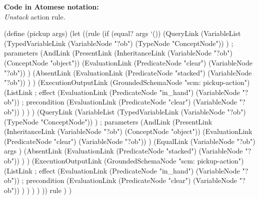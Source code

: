 \begin{footnotesize}
\textbf{Code in Atomese notation:} \\
\textit{Unstack} action rule.
\end{footnotesize}

\begin{python}
(define (pickup args)
  (let 
    ((rule
      (if (equal? args `())
        (QueryLink
          (VariableList
            (TypedVariableLink 
              (VariableNode "?ob") 
              (TypeNode "ConceptNode"))
          ) ; parameters
          (AndLink
            (PresentLink
              (InheritanceLink
                (VariableNode "?ob")
                (ConceptNode "object"))
              (EvaluationLink
                (PredicateNode "clear")
                (VariableNode "?ob"))
            )
            (AbsentLink
              (EvaluationLink
                (PredicateNode "stacked")
                (VariableNode "?ob"))
            )
          )
          (ExecutionOutputLink
            (GroundedSchemaNode "scm: pickup-action")
            (ListLink
              ; effect
              (EvaluationLink
                (PredicateNode "in_hand")
                (VariableNode "?ob"))
              ; precondition
              (EvaluationLink
                (PredicateNode "clear")
                (VariableNode "?ob"))
            )
          )
        )
        (QueryLink
          (VariableList
            (TypedVariableLink 
              (VariableNode "?ob") 
              (TypeNode "ConceptNode"))
          ) ; parameters
          (AndLink
            (PresentLink
              (InheritanceLink
                (VariableNode "?ob")
                (ConceptNode "object"))
              (EvaluationLink
                (PredicateNode "clear")
                (VariableNode "?ob"))
            )
            (EqualLink
              (VariableNode "?ob")
              args
            )
            (AbsentLink
              (EvaluationLink
                (PredicateNode "stacked")
                (VariableNode "?ob"))
            )
          )
          (ExecutionOutputLink
            (GroundedSchemaNode "scm: pickup-action")
            (ListLink
              ; effect
              (EvaluationLink
                (PredicateNode "in_hand")
                (VariableNode "?ob"))
              ; precondition
              (EvaluationLink
                (PredicateNode "clear")
                (VariableNode "?ob"))
            )
          )
        )
      )
    ))
    rule
  )
)
\end{python}
 

